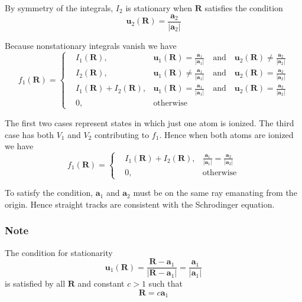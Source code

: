 By symmetry of the integrals, $I_2$ is stationary when $\mathbf R$ satisfies the condition
\begin{equation*}
\mathbf u_2(\mathbf R)
=\frac{\mathbf a_2}{|\mathbf a_2|}
\end{equation*}

Because nonstationary integrals vanish we have
\begin{equation*}
f_1(\mathbf R)=\left\{
\begin{aligned}
& I_1(\mathbf R),
& \mathbf u_1(\mathbf R)=\frac{\mathbf a_1}{|\mathbf a_1|}
\quad\text{and}\quad
\mathbf u_2(\mathbf R)\ne\frac{\mathbf a_2}{|\mathbf a_2|}
\\
& I_2(\mathbf R),
& \mathbf u_1(\mathbf R)\ne\frac{\mathbf a_1}{|\mathbf a_1|}
\quad\text{and}\quad
\mathbf u_2(\mathbf R)=\frac{\mathbf a_2}{|\mathbf a_2|}
\\
& I_1(\mathbf R)+I_2(\mathbf R),
& \mathbf u_1(\mathbf R)=\frac{\mathbf a_1}{|\mathbf a_1|}
\quad\text{and}\quad
\mathbf u_2(\mathbf R)=\frac{\mathbf a_2}{|\mathbf a_2|}
\\
& 0, & \text{otherwise}
\end{aligned}
\right.
\end{equation*}

The first two cases represent states in which just one atom is ionized.
The third case has both $V_1$ and $V_2$ contributing to $f_1$.
Hence when both atoms are ionized we have
\begin{equation*}
f_1(\mathbf R)=\left\{
\begin{aligned}
& I_1(\mathbf R)+I_2(\mathbf R),
& \frac{\mathbf a_1}{|\mathbf a_1|}=\frac{\mathbf a_2}{|\mathbf a_2|}
\\
& 0, & \text{otherwise}
\end{aligned}
\right.
\end{equation*}

To satisfy the condition, $\mathbf a_1$ and $\mathbf a_2$
must be on the same ray emanating from the origin.
Hence straight tracks are consistent with the Schrodinger equation.

\subsubsection*{Note}
The condition for stationarity
\begin{equation*}
\mathbf u_1(\mathbf R)
=\frac{\mathbf R-\mathbf a_1}{|\mathbf R-\mathbf a_1|}
=\frac{\mathbf a_1}{|\mathbf a_1|}
\end{equation*}
is satisfied by all $\mathbf R$ and constant $c>1$ such that
\begin{equation*}
\mathbf R=c\mathbf a_1
\end{equation*}

